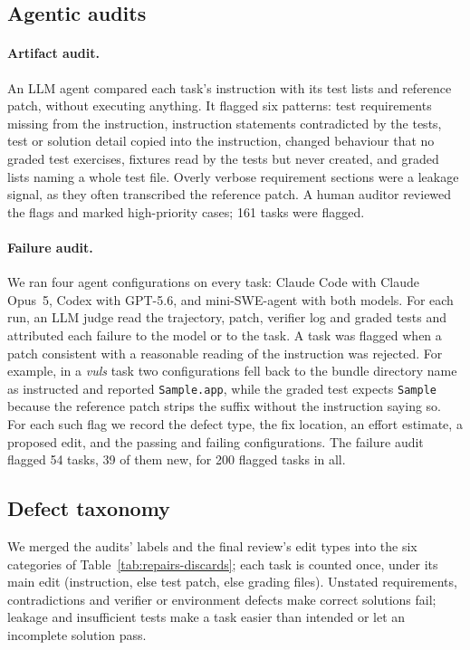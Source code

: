 

\subsection{Agentic audits}
\label{sec:audits}

\paragraph{Artifact audit.}
An LLM agent compared each task's instruction with its test lists and reference patch, without executing anything. It flagged six patterns: test requirements missing from the instruction, instruction statements contradicted by the tests, test or solution detail copied into the instruction, changed behaviour that no graded test exercises, fixtures read by the tests but never created, and graded lists naming a whole test file. Overly verbose requirement sections were a leakage signal, as they often transcribed the reference patch. A human auditor reviewed the flags and marked high-priority cases; 161 tasks were flagged.

\paragraph{Failure audit.}
We ran four agent configurations on every task: Claude Code with Claude Opus~5, Codex with GPT-5.6, and mini-SWE-agent with both models. For each run, an LLM judge read the trajectory, patch, verifier log and graded tests and attributed each failure to the model or to the task. A task was flagged when a patch consistent with a reasonable reading of the instruction was rejected. For example, in a \textit{vuls} task two configurations fell back to the bundle directory name as instructed and reported \texttt{Sample.app}, while the graded test expects \texttt{Sample} because the reference patch strips the suffix without the instruction saying so. For each such flag we record the defect type, the fix location, an effort estimate, a proposed edit, and the passing and failing configurations. The failure audit flagged 54 tasks, 39 of them new, for 200 flagged tasks in all.


\subsection{Defect taxonomy}
\label{sec:taxonomy}

We merged the audits' labels and the final review's edit types into the six categories of Table~\ref{tab:repairs-discards}; each task is counted once, under its main edit (instruction, else test patch, else grading files). Unstated requirements, contradictions and verifier or environment defects make correct solutions fail; leakage and insufficient tests make a task easier than intended or let an incomplete solution pass.

